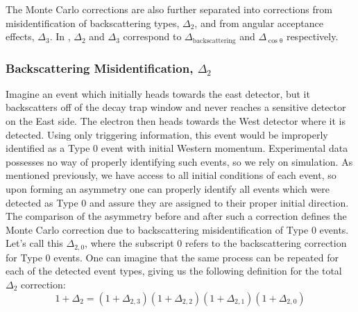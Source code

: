 The Monte Carlo corrections are also further separated into corrections from misidentification
of backscattering types, $\Delta_{2}$, and from angular acceptance effects, $\Delta_{3}$.
In \cite{UCNA2017}, $\Delta_{2}$ and $\Delta_{3}$ correspond to $\Delta_{\mathrm{backscattering}}$ and
$\Delta_{\mathrm{\cos\theta}}$ respectively.

\subsubsection{Backscattering Misidentification, $\Delta_{2}$}
Imagine an event which initially heads towards the east detector, but it backscatters
off of the decay trap window and never reaches a sensitive detector on the East side. The
electron then heads towards the West detector where it is detected. Using only triggering
information, this event would be improperly identified as a Type 0 event with initial Western
momentum. Experimental data possesses no way of properly identifying such events, so we rely
on simulation. As mentioned previously, we have access to all initial conditions of each event,
so upon forming an asymmetry one can properly identify all events which were detected as Type 0
and assure they are assigned to their proper initial direction. The comparison of the asymmetry
before and after such a correction defines the Monte Carlo correction due to backscattering
misidentification of Type 0 events. Let's call this $\Delta_{2,0}$, where the subscript 0 refers
to the backscattering correction for Type 0 events. One can imagine that the same process can
be repeated for each of the detected event types, giving us the following definition for
the total $\Delta_{2}$ correction:
%
\begin{equation}
1+\Delta_{2} = (1+\Delta_{2,3})(1+\Delta_{2,2})(1+\Delta_{2,1})(1+\Delta_{2,0})
\end{equation}

